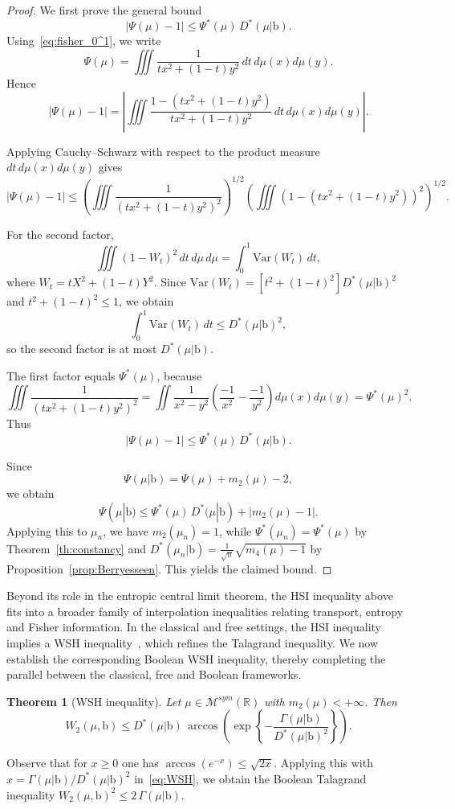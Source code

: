 \documentclass[10pt, reqno]{amsart}
\numberwithin{equation}{section}
\theoremstyle{definition}
\theoremstyle{plain}
\newtheorem{theorem}[definition]{Theorem}
\theoremstyle{remark}
\newcommand{\R}{\mathbb{R}}
\newcommand{\1}{\mathbbm{1}}
\begin{document}
\begin{proof}
We first prove the general bound
\[
|\Psi(\mu)-1|
\le \Psi^*(\mu)\,D^*(\mu|\mathbb{\mathrm b}).
\]
Using~\eqref{eq:fisher_0^1}, we write
\[
\Psi(\mu)
=\iiint \frac{1}{t x^2+(1-t)y^2}\,dt\,d\mu(x)d\mu(y).
\]
Hence
\[
|\Psi(\mu)-1|
=\left|
\iiint 
\frac{1-(t x^2+(1-t)y^2)}{t x^2+(1-t)y^2}
\,dt\,d\mu(x)d\mu(y)
\right|.
\]

Applying Cauchy--Schwarz with respect to the product measure
$dt\,d\mu(x)d\mu(y)$ gives
\[
|\Psi(\mu)-1|
\le
\left(
\iiint \frac{1}{(t x^2+(1-t)y^2)^2}
\right)^{1/2}
\left(
\iiint (1-(t x^2+(1-t)y^2))^2
\right)^{1/2}.
\]

For the second factor,
\[
\iiint(1-W_t)^2\,dt\,d\mu\,d\mu = \int_0^1\mathrm{Var}(W_t)\,dt,
\]
where $W_t=tX^2+(1-t)Y^2$. Since $\mathrm{Var}(W_t)=[t^2+(1-t)^2]D^*(\mu|\mathrm{b})^2$ and $t^2+(1-t)^2\leq 1$, we obtain
\[
\int_0^1\mathrm{Var}(W_t)\,dt \leq D^*(\mu|\mathrm{b})^2,
\]
so the second factor is at most $D^*(\mu|\mathrm{b})$.

The first factor equals $\Psi^*(\mu)$, because
\[
\iiint \frac{1}{(t x^2+(1-t)y^2)^2}
=
\iint \frac{1}{x^2-y^2}\!\left(\frac{-1}{x^2}-\frac{-1}{y^2}\right)
d\mu(x)d\mu(y)
=\Psi^*(\mu)^2.
\]
Thus
\[
|\Psi(\mu)-1|
\le \Psi^*(\mu)\,D^*(\mu|\mathbb{\mathrm b}).
\]

Since
\[
\Psi(\mu|\mathbb{\mathrm b})
=\Psi(\mu)+m_2(\mu)-2,
\]
we obtain
\[
\Psi(\mu|\mathbb{\mathrm b})
\le \Psi^*(\mu)\,D^*(\mu|\mathbb{\mathrm b})
+|m_2(\mu)-1|.
\]
Applying this to $\mu_n$, we have $m_2(\mu_n)=1$, while
$\Psi^*(\mu_n)=\Psi^*(\mu)$ by Theorem~\ref{th:constancy}
and
$D^*(\mu_n|\mathbb{\mathrm b})=\frac{1}{\sqrt n}\sqrt{m_4(\mu)-1}$
by Proposition~\ref{prop:Berryesseen}.
This yields the claimed bound.
\end{proof}

Beyond its role in the entropic central limit theorem, the HSI inequality above fits into a broader family of interpolation inequalities relating transport, entropy and Fisher information. 
In the classical and free settings, the HSI inequality implies a WSH inequality~\cite{ledoux2015stein,cebron2021quantitative}, which refines the Talagrand inequality. 
We now establish the corresponding Boolean WSH inequality, thereby completing the parallel between the classical, free and Boolean frameworks.
\begin{theorem}[WSH inequality]\label{prop:WSH}
Let $\mu\in\mathcal{M}^{sym}(\R)$ with $m_2(\mu)<+\infty$.
Then
\begin{equation}\label{eq:WSH}
W_2(\mu,\mathbb{\mathrm{b}})
\le
D^*(\mu|\mathbb{\mathrm{b}})\,
\arccos\!\left(
\exp\!\left\{-\frac{\Gamma(\mu|\mathbb{\mathrm{b}})}{D^*(\mu|\mathbb{\mathrm{b}})^2}\right\}
\right).
\end{equation}
\end{theorem}
Observe that for $x\ge 0$ one has
$\arccos(e^{-x}) \le \sqrt{2x}.$
Applying this with 
$x=\Gamma(\mu|\mathbb{\mathrm b})/D^*(\mu|\mathbb{\mathrm b})^2$ 
in~\eqref{eq:WSH}, we obtain the Boolean Talagrand inequality
$
W_2(\mu,\mathbb{\mathrm b})^2
\le
2\,\Gamma(\mu|\mathbb{\mathrm b}).$
\end{document}
